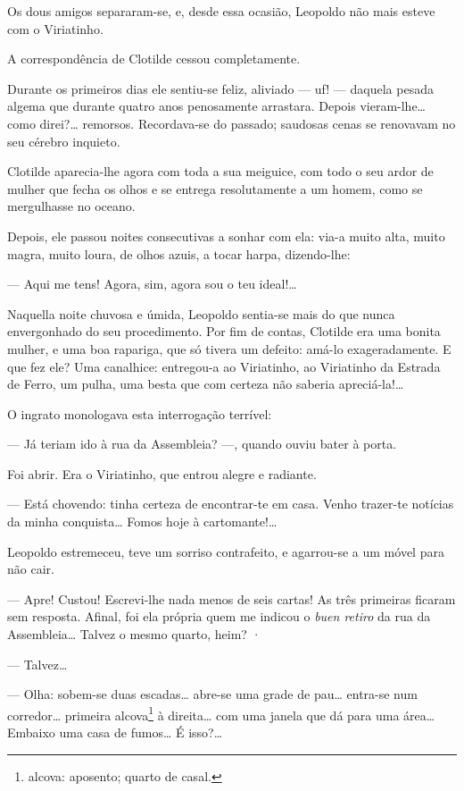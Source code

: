 Os dous amigos separaram-se, e, desde essa ocasião, Leopoldo não mais
esteve com o Viriatinho.

A correspondência de Clotilde cessou completamente.

Durante os primeiros dias ele sentiu-se feliz, aliviado --- uf! ---
daquela pesada algema que durante quatro anos penosamente arrastara.
Depois vieram-lhe\ldots{} como direi?\ldots{} remorsos. Recordava-se do passado;
saudosas cenas se renovavam no seu cérebro inquieto.

Clotilde aparecia-lhe agora com toda a sua meiguice, com todo o seu
ardor de mulher que fecha os olhos e se entrega resolutamente a um
homem, como se mergulhasse no oceano.

Depois, ele passou noites consecutivas a sonhar com ela: via-a muito
alta, muito magra, muito loura, de olhos azuis, a tocar harpa,
dizendo-lhe:

--- Aqui me tens! Agora, sim, agora sou o teu ideal!\ldots{}

Naquella noite chuvosa e úmida, Leopoldo sentia-se mais do que nunca
envergonhado do seu procedimento. Por fim de contas, Clotilde era uma
bonita mulher, e uma boa rapariga, que só tivera um defeito: amá-lo
exageradamente. E que fez ele? Uma canalhice: entregou-a ao Viriatinho,
ao Viriatinho da Estrada de Ferro, um pulha, uma besta que com certeza
não saberia apreciá-la!\ldots{}

O ingrato monologava esta interrogação terrível:

--- Já teriam ido à rua da Assembleia? ---, quando ouviu bater à porta.

Foi abrir. Era o Viriatinho, que entrou alegre e radiante.

--- Está chovendo: tinha certeza de encontrar-te em casa. Venho
trazer-te notícias da minha conquista\ldots{} Fomos hoje à
cartomante!\ldots{}

Leopoldo estremeceu, teve um sorriso contrafeito, e agarrou-se a um
móvel para não cair.

--- Apre! Custou! Escrevi-lhe nada menos de seis cartas! As três
primeiras ficaram sem resposta. Afinal, foi ela própria quem me indicou
o \emph{buen retiro} da rua da Assembleia\ldots{} Talvez o mesmo quarto,
heim? ·

--- Talvez\ldots{}

--- Olha: sobem-se duas escadas\ldots{} abre-se uma grade de pau\ldots{} entra-se
num corredor\ldots{} primeira alcova\footnote{alcova: aposento; quarto de
  casal.} à direita\ldots{} com uma janela que dá para uma área\ldots{} Embaixo
uma casa de fumos\ldots{} É isso?\ldots{}

